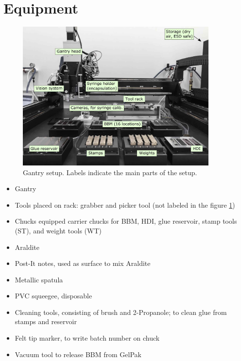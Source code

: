\documentclass[12pt]{unlsilabsop}
\begin{document}
\section{Equipment}
\begin{center}
\begin{figure}[h]
\includegraphics[width=0.9\textwidth]{img/gantryFull16labeled.jpg}
\caption{Gantry setup. Labels indicate the main parts of the setup.}
\label{gantry_setup}
\end{figure}
\end{center}

\begin{itemize}
    \item Gantry
    \item Tools placed on rack: grabber and picker tool (not labeled in the figure  \ref{gantry_setup})
    \item Chucks equipped carrier chucks for BBM, HDI, glue reservoir, stamp tools (ST), and weight tools (WT)
    \item Araldite
    \item Post-It notes, used as surface to mix Araldite
    \item Metallic spatula
    \item PVC squeegee, disposable
    \item Cleaning tools, consisting of brush and 2-Propanole; to clean glue from stamps and reservoir
    \item Felt tip marker, to write batch number on chuck
    \item Vacuum tool to release BBM from GelPak
\end{itemize}
\end{document}
